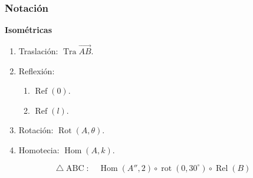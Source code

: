 \subsubsection{Notación}

\textbf{Isométricas}
\begin{enumerate}
	\item Traslación: $\operatorname{Tra}\overrightarrow{AB}$.
	\item Reflexión: 
	\begin{enumerate}
		\item $\operatorname{Ref}(0)$. 
		\item $\operatorname{Ref}(l)$. 
	\end{enumerate}
\item Rotación: $\operatorname{Rot}(A,\theta)$.
\item Homotecia:  $\operatorname{Hom}(A,k)$.
\end{enumerate}

\begin{ejemplo}
	$$\triangle \operatorname{ABC}:\quad \operatorname{Hom}(A'', 2)\circ \operatorname{rot}(0,30^{\circ})\circ \operatorname{Rel}(B) $$
\end{ejemplo}
